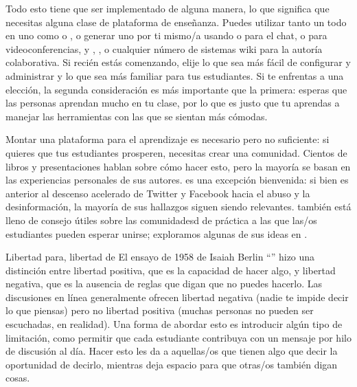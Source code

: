 Todo esto tiene que ser implementado de alguna manera,
lo que significa que necesitas alguna clase de plataforma de enseñanza.
Puedes utilizar tanto un  todo en uno
como  o ,
o generar uno por ti mismo/a 
usando  o  para el chat,
o  para videoconferencias,
y ,
,
o cualquier número de sistemas wiki para la autoría colaborativa.
Si recién estás comenzando,
elije lo que sea más fácil de configurar y administrar
y lo que sea más familiar para tus estudiantes.
Si te enfrentas a una elección,
la segunda consideración es más importante que la primera:
esperas que las personas aprendan mucho en tu clase,
por lo que es justo que tu aprendas a manejar las herramientas con las que se sientan más cómodas.

Montar una plataforma para el aprendizaje es necesario pero no suficiente:
si quieres que tus estudiantes prosperen,
necesitas crear una comunidad.
Cientos de libros y presentaciones hablan sobre cómo hacer esto,
pero la mayoría se basan en las experiencias personales de sus autores.
\cite{Krau2016} es una excepción bienvenida:
si bien es anterior al descenso acelerado de Twitter y Facebook hacia el abuso y la desinformación,
la mayoría de sus hallazgos siguen siendo relevantes.
\cite{Foge2005} también está lleno de consejo útiles
sobre las comunidadesd de práctica a las que las/os estudiantes pueden esperar unirse;
exploramos algunas de sus ideas en .

\begin{aside}{Libertad para, libertad de}
  El ensayo de 1958 de Isaiah Berlin
  ``''
  hizo una distinción entre libertad positiva,
  que es la capacidad de hacer algo,
  y libertad negativa,
  que es la ausencia de reglas que digan que no puedes hacerlo.
  Las discusiones en línea generalmente ofrecen libertad negativa
  (nadie te impide decir lo que piensas)
  pero no libertad positiva
  (muchas personas no pueden ser escuchadas, en realidad).
  Una forma de abordar esto es introducir algún tipo de limitación,
  como permitir que cada estudiante contribuya con un mensaje por hilo de discusión al día.
  Hacer esto les da a aquellas/os que tienen algo que decir la oportunidad de decirlo,
  mientras deja espacio para que otras/os también digan cosas.
\end{aside}

